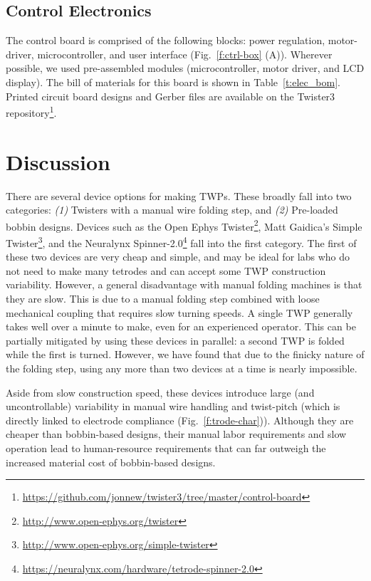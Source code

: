 \documentclass[11pt,a4paper]{article}
\begin{document}
\subsection{Control Electronics}
The control board is comprised of the following blocks: power regulation,
motor-driver, microcontroller, and user interface (Fig.~\ref{f:ctrl-box} (A)).
Wherever possible, we used pre-assembled modules (microcontroller, motor
driver, and LCD display). The bill of materials for this board is shown in
Table~\ref{t:elec_bom}. Printed circuit board designs and Gerber files are
available on the Twister3
repository\footnote{\url{https://github.com/jonnew/twister3/tree/master/control-board}}.

\section{Discussion}
There are several device options for making TWPs. These broadly fall into two
categories: \textit{(1)} Twisters with a manual wire folding step, and
\textit{(2)} Pre-loaded bobbin designs. Devices such as the Open Ephys
Twister\footnote{\url{http://www.open-ephys.org/twister}}, Matt Gaidica's
Simple Twister\footnote{\url{http://www.open-ephys.org/simple-twister}}, and
the Neuralynx
Spinner-2.0\footnote{\url{https://neuralynx.com/hardware/tetrode-spinner-2.0}}
fall into the first category. The first of these two devices are very cheap and
simple, and may be ideal for labs who do not need to make many tetrodes and can
accept some TWP construction variability. However, a general disadvantage with manual
folding machines is that they are slow. This is due to a  manual folding step
combined with loose mechanical coupling that requires slow turning speeds.  A
single TWP generally takes well over a minute to make, even for an experienced
operator. This can be partially mitigated by using these devices in
parallel: a second TWP is folded while the first is turned. However, we have
found that due to the finicky nature of the folding step, using any more than
two devices at a time is nearly impossible.

Aside from slow construction speed, these devices introduce large (and
uncontrollable) variability in manual wire handling and twist-pitch (which is
directly linked to electrode compliance (Fig.~\ref{f:trode-char})). Although
they are cheaper than bobbin-based designs, their manual labor requirements and
slow operation lead to human-resource requirements that can far outweigh the
increased material cost of bobbin-based designs.
\end{document}

